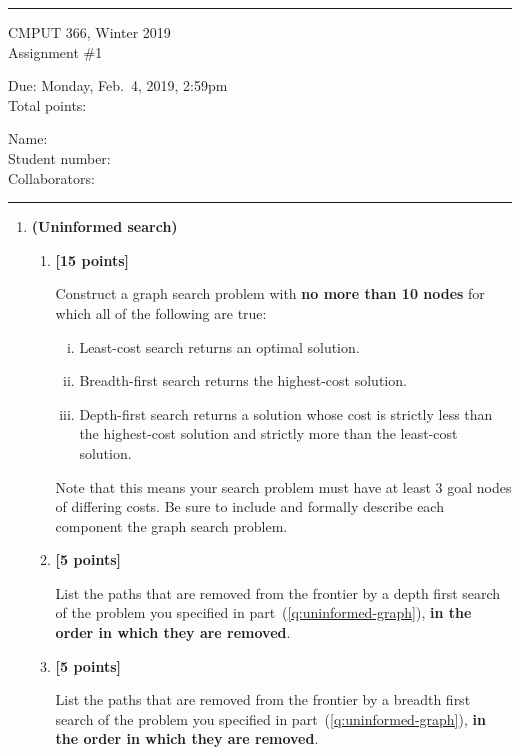 \documentclass{article}
\newcounter{totalpoints}
\newcommand{\points}[1]{{\addtocounter{totalpoints}{#1}\textbf{[#1 points]}}}
\begin{document}
{\bigskip\hrule\bigskip
\huge
\noindent CMPUT 366, Winter 2019\\
Assignment \#1

\large
Due: Monday, Feb.\ 4, 2019, 2:59pm\\
Total points: 

\normalsize
Name:\\
Student number:\\
Collaborators:

\bigskip\hrule\bigskip
}

\pagestyle{myheadings}

\begin{enumerate}

\item \textbf{(Uninformed search)}
\begin{enumerate}
\item \points{15} \label{q:uninformed-graph}
Construct a graph search problem with \textbf{no more than 10 nodes} for which all of the following are true:
\begin{enumerate}[i.]
    \item Least-cost search returns an optimal solution.
    \item Breadth-first search returns the highest-cost solution.
    \item Depth-first search returns a solution whose cost is strictly less than the highest-cost solution and strictly more than the least-cost solution.
\end{enumerate}
Note that this means your search problem must have at least 3 goal nodes of differing costs.
Be sure to include and formally describe each component the graph search problem.

\begin{answer}{2.5in}
\end{answer}


\item \points{5}
List the paths that are removed from the frontier by a depth first search of the problem you specified in part~(\ref{q:uninformed-graph}), \textbf{in the order in which they are removed}.

\begin{answer}{1in}
\end{answer}

\item \points{5}
List the paths that are removed from the frontier by a breadth first search of the problem you specified in part~(\ref{q:uninformed-graph}), \textbf{in the order in which they are removed}.


\end{enumerate}
\end{enumerate}
\end{document}
